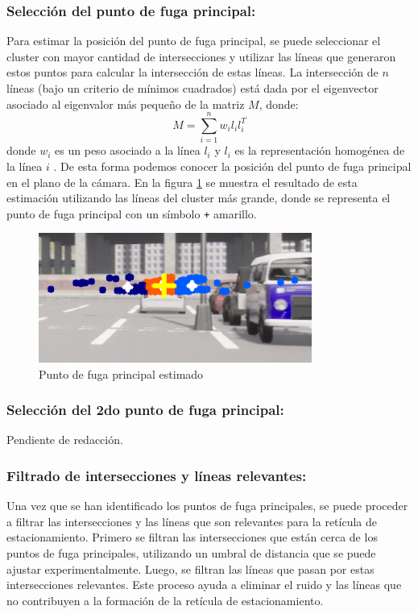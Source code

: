 \subsubsection{Selección del punto de fuga principal:}
\noindent
Para estimar la posición del punto de fuga principal, se puede seleccionar el cluster con mayor cantidad de intersecciones y
utilizar las líneas que generaron estos puntos para calcular la intersección de estas líneas.
La intersección de $n$ líneas (bajo un criterio de mínimos cuadrados) está dada por
el eigenvector asociado al eigenvalor más pequeño de la matriz $M$, donde:
\[
    M = \sum_{i=1}^{n} w_i l_i l_i^T
\]
donde $w_i$ es un peso asociado a la línea $l_i$ y $l_i$ es la representación homogénea de la línea $i$ \cite{kanatani1998statistical}.
De esta forma podemos conocer la posición del punto de fuga principal en el plano de la cámara.
En la figura \ref{fig:vanishingPoint} se muestra el resultado de esta estimación utilizando las líneas del cluster más grande, donde se
representa el punto de fuga principal con un símbolo \texttt{+} amarillo.
\begin{figure}[!ht]
    \centering
    \includegraphics[width=0.8\textwidth]{img/reticule/vanishingPoint}
    \caption{Punto de fuga principal estimado}
    \label{fig:vanishingPoint}
\end{figure}

\subsubsection{Selección del 2do punto de fuga principal:}
Pendiente de redacción.

\subsubsection{Filtrado de intersecciones y líneas relevantes:}
\noindent
Una vez que se han identificado los puntos de fuga principales, se puede proceder a filtrar las intersecciones y las líneas que son
relevantes para la retícula de estacionamiento.
Primero se filtran las intersecciones que están cerca de los puntos de fuga principales, utilizando un umbral de distancia que se puede ajustar experimentalmente.
Luego, se filtran las líneas que pasan por estas intersecciones relevantes.
Este proceso ayuda a eliminar el ruido y las líneas que no contribuyen a la formación de la retícula de estacionamiento.


